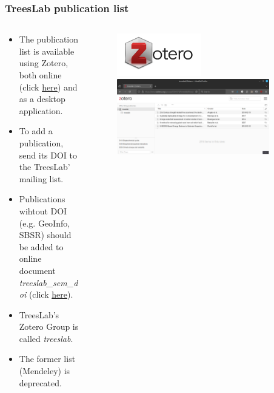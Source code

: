 \documentclass[aspectratio=169]{beamer}
\begin{document}
\begin{frame}
	\frametitle{TreesLab publication list}
	\begin{columns}
		\begin{column}{0.5\textwidth}
            \begin{itemize}
                \item The publication list is available using Zotero, both 
                    online (click
                  \href{https://www.zotero.org/groups/5304570/treeslab/library}
                    {here}) and as a desktop application.
                \item To add a publication, send its DOI to the TreesLab' 
                    mailing list.
                \item Publications wihtout DOI (e.g. GeoInfo, SBSR) should be
                    added to online document \emph{treeslab\_sem\_doi} (click 
\href{https://docs.google.com/document/d/1pnIX_u3Si7J9OBJ1drsbBws5Fgrju_gM4Iyv_DvEw7g/edit?usp=sharing}
                    {here}).
                \item TreesLab's Zotero Group is called \emph{treeslab}.
                \item The former list (Mendeley) is deprecated.
            \end{itemize}
		\end{column}
		\begin{column}{0.5\textwidth}
			\begin{figure}
				\centering
				\includegraphics[width=0.5\textwidth]{logos/zotero.jpg}
                \includegraphics[width=0.9\textwidth]{img/zotero_treeslab.png}
			\end{figure}
		\end{column}
	\end{columns}
\end{frame}
\end{document}
